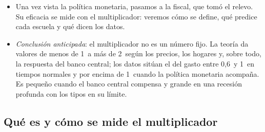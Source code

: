 \documentclass[11pt]{article}
\begin{document}
\begin{itemize}
\item Una vez vista la política monetaria, pasamos a la fiscal, que tomó el relevo. Su eficacia se mide con el multiplicador: veremos cómo se define, qué predice cada escuela y qué dicen los datos.
\item \emph{Conclusión anticipada}: el multiplicador no es un número fijo. La teoría da valores de menos de 1~a más de 2~según los precios, los hogares y, sobre todo, la respuesta del banco central; los datos sitúan el del gasto entre 0,6~y 1~en tiempos normales y por encima de 1~cuando la política monetaria acompaña. Es pequeño cuando el banco central compensa y grande en una recesión profunda con los tipos en su límite.
\end{itemize}

\subsection{Qué es y cómo se mide el multiplicador}\label{sec:medida-multiplicador}
\end{document}
